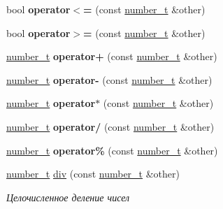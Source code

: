 \begin{DoxyCompactItemize}
\mbox{\label{classnumber__t_ab23509dad5bfadd4f0ec1087edb0cfcf}} 
bool {\bfseries operator$<$=} (const \mbox{\hyperlink{classnumber__t}{number\+\_\+t}} \&other)
\item 
\mbox{\label{classnumber__t_ad0c004c476a1957cf7b1739da2b3f2ab}} 
bool {\bfseries operator$>$=} (const \mbox{\hyperlink{classnumber__t}{number\+\_\+t}} \&other)
\item 
\mbox{\label{classnumber__t_ad4a3796b50ebfe92f431ee775aa9f6b1}} 
\mbox{\hyperlink{classnumber__t}{number\+\_\+t}} {\bfseries operator+} (const \mbox{\hyperlink{classnumber__t}{number\+\_\+t}} \&other)
\item 
\mbox{\label{classnumber__t_ae84652c43ac0276ab8dc4d81159d0982}} 
\mbox{\hyperlink{classnumber__t}{number\+\_\+t}} {\bfseries operator-\/} (const \mbox{\hyperlink{classnumber__t}{number\+\_\+t}} \&other)
\item 
\mbox{\label{classnumber__t_af23fecdd6694e7fc01de19ac15733854}} 
\mbox{\hyperlink{classnumber__t}{number\+\_\+t}} {\bfseries operator$\ast$} (const \mbox{\hyperlink{classnumber__t}{number\+\_\+t}} \&other)
\item 
\mbox{\label{classnumber__t_aa475e09b8b3131516ba22aff5c00683f}} 
\mbox{\hyperlink{classnumber__t}{number\+\_\+t}} {\bfseries operator/} (const \mbox{\hyperlink{classnumber__t}{number\+\_\+t}} \&other)
\item 
\mbox{\label{classnumber__t_a081a6ca6cd71e2481165fc96c865264a}} 
\mbox{\hyperlink{classnumber__t}{number\+\_\+t}} {\bfseries operator\%} (const \mbox{\hyperlink{classnumber__t}{number\+\_\+t}} \&other)
\item 
\mbox{\label{classnumber__t_a1835d01c8fb573827545069b9a587dd8}} 
\mbox{\hyperlink{classnumber__t}{number\+\_\+t}} \mbox{\hyperlink{classnumber__t_a1835d01c8fb573827545069b9a587dd8}{div}} (const \mbox{\hyperlink{classnumber__t}{number\+\_\+t}} \&other)
\begin{DoxyCompactList}\small\item\em Целочисленное деление чисел \end{DoxyCompactList}\end{DoxyCompactItemize}
